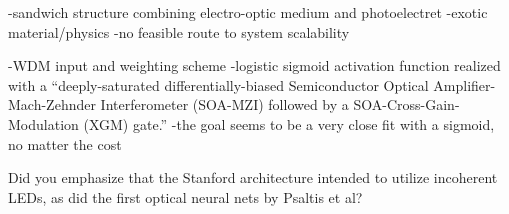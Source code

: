 \cite{mebo2015}

\cite{lipe2019}

\cite{tafe2018}

\cite{rokr2009}


\cite{mo2000}
-sandwich structure combining electro-optic medium and photoelectret
-exotic material/physics
-no feasible route to system scalability

\cite{mots2019}
-WDM input and weighting scheme
-logistic sigmoid activation function realized with a ``deeply-saturated differentially-biased Semiconductor Optical Amplifier-Mach-Zehnder Interferometer (SOA-MZI) followed by a SOA-Cross-Gain-Modulation (XGM) gate.''
-the goal seems to be a very close fit with a sigmoid, no matter the cost

\vspace{3em}
Did you emphasize that the Stanford architecture intended to utilize incoherent LEDs, as did the first optical neural nets by Psaltis et al?